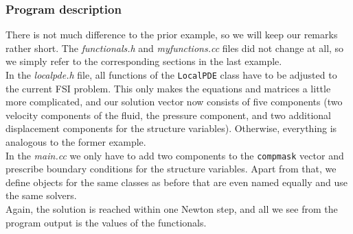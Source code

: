\subsubsection{Program description}

There is not much difference to the prior example, so we will keep our remarks rather short. The \textit{functionals.h} and \textit{myfunctions.cc} files did not change at all, so we simply refer to the corresponding sections in the last example.\\
In the \textit{localpde.h} file, all functions of the \texttt{LocalPDE} class have to be adjusted to the current FSI problem. This only makes the equations and matrices a little more complicated, and our solution vector now consists of five components (two velocity components of the fluid, the pressure component, and two additional displacement components for the structure variables). Otherwise, everything is analogous to the former example.\\
In the \textit{main.cc} we only have to add two components to the \texttt{compmask} vector and prescribe boundary conditions for the structure variables. Apart from that, we define objects for the same classes as before that are even named equally and use the same solvers.\\ 
Again, the solution is reached within one Newton step, and all we see from the program output is the values of the functionals.
